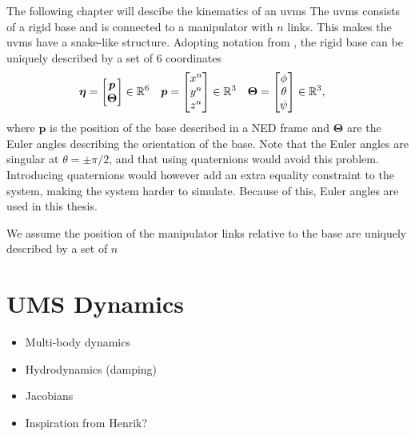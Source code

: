 The following chapter will descibe the kinematics of an \gls{uvms}
The \gls{uvms} consists of a rigid base and is connected to
a manipulator with $n$ links. This makes the \gls{uvms} have a snake-like structure.
Adopting notation from \cite{fossen2021}, the rigid base can be uniquely described
by a set of $6$ coordinates
\begin{align}
    \bm{\eta} &= \begin{bmatrix} \bm{p} \\ \bm{\Theta} \end{bmatrix} \in \mathbb{R}^6 &
        \bm{p} &= \begin{bmatrix} x^n \\ y^n \\ z^n \end{bmatrix} \in \mathbb{R}^3 &
    \bm{\Theta} &= \begin{bmatrix} \phi \\ \theta \\ \psi \end{bmatrix} \in \mathbb{R}^3,
\end{align}
where $\bm{p}$ is the position of the base described in a NED frame and $\bm{\Theta}$
are the Euler angles describing the orientation of the base. Note that the Euler
angles are singular at $\theta = \pm \pi/2$, and that using quaternions
would avoid this problem. Introducing quaternions would however add an extra
equality constraint to the system, making the system harder to simulate. Because
of this, Euler angles are used in this thesis. 

We assume the position of the manipulator links relative to the base are uniquely
described by a set of $n$


\section{UMS Dynamics}




{
    \color{red}
    \begin{itemize}
        \item Multi-body dynamics
        \item Hydrodynamics (damping)
        \item Jacobians
        \item Inspiration from Henrik?
    \end{itemize}
}
\fi
